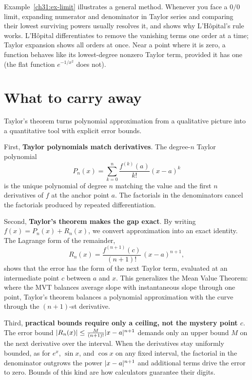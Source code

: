 \begin{connectionbox}
Example~\ref{ch31:ex-limit} illustrates a general method. Whenever you face a $0/0$ limit,
expanding numerator and denominator in Taylor series and comparing their lowest surviving
powers usually resolves it, and shows why L'H\^opital's rule works.
L'H\^opital differentiates to remove the vanishing terms one order at a time; Taylor expansion
shows all orders at once. Near a point where it is zero, a function behaves like its
lowest-degree nonzero Taylor term, provided it has one (the flat function $e^{-1/x^2}$ does not).
\end{connectionbox}

\section{What to carry away}

Taylor's theorem turns polynomial approximation from a qualitative picture into a quantitative
tool with explicit error bounds.

First, \textbf{Taylor polynomials match derivatives}. The degree-$n$ Taylor
polynomial
\[
  P_n(x) = \sum_{k=0}^n \frac{f^{(k)}(a)}{k!}(x-a)^k
\]
is the unique polynomial of
degree $n$ matching the value and the first $n$ derivatives of $f$ at the anchor point $a$.
The factorials in the denominators cancel the factorials produced by repeated differentiation.

Second, \textbf{Taylor's theorem makes the gap exact}. By writing $f(x) = P_n(x) + R_n(x)$,
we convert approximation into an exact identity. The Lagrange form of the remainder,
\[
  R_n(x) = \frac{f^{(n+1)}(c)}{(n+1)!}\,(x-a)^{n+1},
\]
shows that the error has the form of the next Taylor term, evaluated at an intermediate point
$c$ between $a$ and $x$. This generalizes the Mean Value Theorem: where the MVT balances
average slope with instantaneous slope through one point, Taylor's theorem balances a polynomial
approximation with the curve through the $(n+1)$-st derivative.

Third, \textbf{practical bounds require only a ceiling, not the mystery point $c$}.
The error bound $\lvert R_n(x)\rvert \le \frac{M}{(n+1)!}\lvert x-a\rvert^{n+1}$ demands only an upper bound
$M$ on the next derivative over the interval. When the derivatives stay uniformly bounded,
as for $e^x$, $\sin x$, and $\cos x$ on any fixed interval, the factorial in the denominator
outgrows the power $\lvert x-a\rvert^{n+1}$ and additional terms drive the error to zero.
Bounds of this kind are how calculators guarantee their digits.

